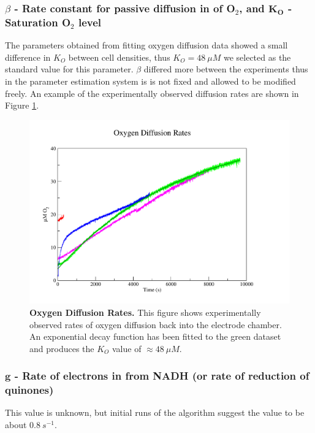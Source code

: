 \subsubsection*{$\beta$ {\bf- Rate constant for passive diffusion in of O$_{\textrm{2}}$}, and $\mathbf{K_O}$ {\bf- Saturation O$_{\textrm{2}}$ level}}
The parameters obtained from fitting oxygen diffusion data showed a small difference in $K_O$ between cell densities, thus $K_O = 48~\mu M$ we selected as the standard value for this parameter. $\beta$ differed more between the experiments thus in the parameter estimation system is is not fixed and allowed to be modified freely. An example of the experimentally observed diffusion rates are shown in Figure \ref{fig:o2rec}.
\begin{figure}[tbp]
 \centering
 \includegraphics[width=14cm, trim=2cm 1cm 4cm 1cm]{./04-model/data/o2rec.pdf}
 \caption[Oxygen Diffusion Rates]{{\bf Oxygen Diffusion Rates.} This figure shows experimentally observed rates of oxygen diffusion back into the electrode chamber. An exponential decay function has been fitted to the green dataset and produces the $K_O$ value of $\approx 48~\mu M$.
 \label{fig:o2rec}}
\end{figure}


\subsubsection*{$\mathbf{g}$ {\bf- Rate of electrons in from NADH (or rate of reduction of quinones)}}
This value is unknown, but initial runs of the algorithm suggest the value to be about $0.8~s^{-1}$.

